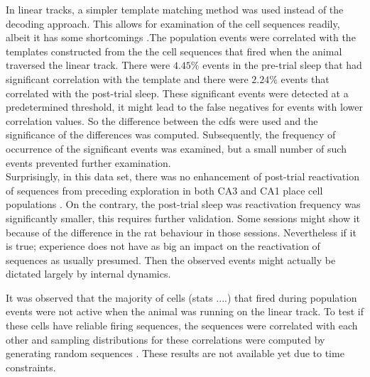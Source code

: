 In linear tracks, a simpler template matching method was used instead of the decoding approach. This allows for examination of the cell sequences readily, albeit it has some shortcomings \cite{Tatsuno2006}.The population events were correlated with the templates constructed from the the cell sequences that fired when the animal traversed the linear track. There were $4.45 \% $ events in the pre-trial sleep that had significant correlation with the template and there were $ 2.24 \% $  events that correlated with the post-trial sleep. These significant events were detected at a predetermined threshold, it might lead to the false negatives for events with lower correlation values. So the difference between the cdfs were used and the significance of the differences was computed. Subsequently, the frequency of occurrence of the significant events was examined, but a small number of such events prevented further examination.\\ 
Surprisingly, in this data set, there was no enhancement of post-trial reactivation of sequences from preceding exploration in both CA3 and CA1 place cell populations \cite{Lee2002}. On the contrary, the post-trial sleep was reactivation frequency was significantly smaller, this requires further validation. Some sessions might show it because of the difference in the rat behaviour in those sessions. Nevertheless if it is true; experience does not have as big an impact on the reactivation of sequences as usually presumed. Then the observed events might actually be dictated largely by internal dynamics. 

It was observed that the majority of cells (stats ....) that fired during population events were not active when the animal was running on the linear track. To test if these cells have reliable firing sequences, the sequences were correlated with each other and sampling distributions for these correlations were computed by generating random sequences \cite{Nadasdy1999}. These results are not available yet due to time constraints. 

